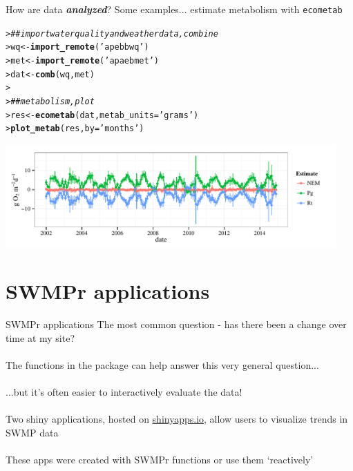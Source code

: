 \documentclass[serif]{beamer}\usepackage[]{graphicx}\usepackage[]{color}
\makeatletter
\newcommand{\hlstr}[1]{\textcolor[rgb]{0.192,0.494,0.8}{#1}}%
\newcommand{\hlcom}[1]{\textcolor[rgb]{0.678,0.584,0.686}{\textit{#1}}}%
\newcommand{\hlstd}[1]{\textcolor[rgb]{0.345,0.345,0.345}{#1}}%
\newcommand{\hlkwb}[1]{\textcolor[rgb]{0.69,0.353,0.396}{#1}}%
\newcommand{\hlkwc}[1]{\textcolor[rgb]{0.333,0.667,0.333}{#1}}%
\newcommand{\hlkwd}[1]{\textcolor[rgb]{0.737,0.353,0.396}{\textbf{#1}}}%
\newenvironment{kframe}{%
 \def\at@end@of@kframe{}%
 \ifinner\ifhmode%
  \def\at@end@of@kframe{\end{minipage}}%
  \begin{minipage}{\columnwidth}%
 \fi\fi%
 \def\FrameCommand##1{\hskip\@totalleftmargin \hskip-\fboxsep
 \colorbox{shadecolor}{##1}\hskip-\fboxsep
     \hskip-\linewidth \hskip-\@totalleftmargin \hskip\columnwidth}%
 \MakeFramed {\advance\hsize-\width
   \@totalleftmargin\z@ \linewidth\hsize
   \@setminipage}}%
 {\par\unskip\endMakeFramed%
 \at@end@of@kframe}
\newenvironment{knitrout}{}{} %
\newcommand{\Bigtxt}[1]{\textbf{\textit{#1}}}
\makeatother
\begin{document}
\begin{frame}[fragile,t]{How are data \Bigtxt{analyzed}?}
Some examples... estimate metabolism with \texttt{ecometab}
\begin{knitrout}\scriptsize
{}\color{fgcolor}\begin{kframe}
\begin{alltt}
\hlstd{> }\hlcom{## import water quality and weather data, combine}
\hlstd{> }\hlstd{wq} \hlkwb{<-} \hlkwd{import_remote}\hlstd{(}\hlstr{'apebbwq'}\hlstd{)}
\hlstd{> }\hlstd{met} \hlkwb{<-} \hlkwd{import_remote}\hlstd{(}\hlstr{'apaebmet'}\hlstd{)}
\hlstd{> }\hlstd{dat} \hlkwb{<-} \hlkwd{comb}\hlstd{(wq, met)}
\hlstd{> }
\hlstd{> }\hlcom{## metabolism, plot}
\hlstd{> }\hlstd{res} \hlkwb{<-} \hlkwd{ecometab}\hlstd{(dat,} \hlkwc{metab_units} \hlstd{=} \hlstr{'grams'}\hlstd{)}
\hlstd{> }\hlkwd{plot_metab}\hlstd{(res,} \hlkwc{by} \hlstd{=} \hlstr{'months'}\hlstd{)}
\end{alltt}
\end{kframe}
\end{knitrout}
\begin{knitrout}
\color{fgcolor}

{\centering \includegraphics[width=0.95\textwidth]{fig//ecometab-1} 

}



\end{knitrout}
\end{frame}

\section{SWMPr applications}

\begin{frame}{SWMPr applications}
The most common question - has there been a change over time at my site? \\~\\
The functions in the package can help answer this very general question...\\~\\
...but it's often easier to interactively evaluate the data! \\~\\
Two shiny applications, hosted on \href{http://www.shinyapps.io/}{shinyapps.io}, allow users to visualize trends in SWMP data \\~\\
These apps were created with SWMPr functions or use them `reactively'
\end{frame}
\end{document}
